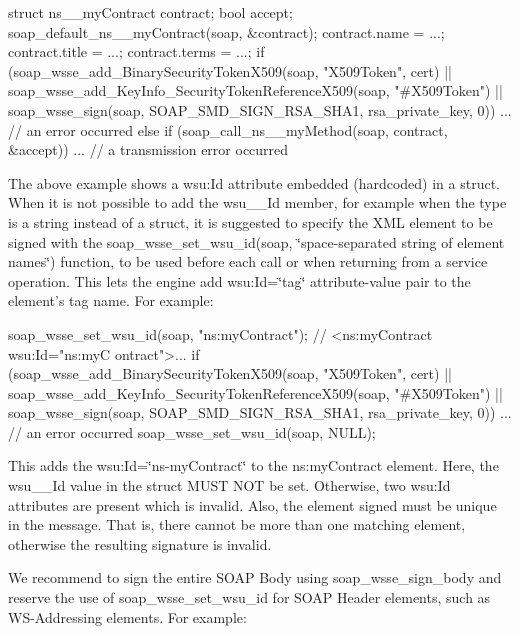 \begin{DoxyCode}
    struct ns__myContract contract;
    bool accept;
    soap_default_ns__myContract(soap, &contract);
    contract.name = ...;
    contract.title = ...;
    contract.terms = ...;
    if (soap_wsse_add_BinarySecurityTokenX509(soap, "X509Token", cert)
     || soap_wsse_add_KeyInfo_SecurityTokenReferenceX509(soap, "#X509Token")
     || soap_wsse_sign(soap, SOAP_SMD_SIGN_RSA_SHA1, rsa_private_key, 0))
      ... // an error occurred
    else if (soap_call_ns__myMethod(soap, contract, &accept))
      ... // a transmission error occurred
\end{DoxyCode}


The above example shows a wsu:Id attribute embedded (hardcoded) in a struct. When it is not possible to add the wsu\_\-\_\-Id member, for example when the type is a string instead of a struct, it is suggested to specify the XML element to be signed with the soap\_\-wsse\_\-set\_\-wsu\_\-id(soap, \char`\"{}space-\/separated string of element
names\char`\"{}) function, to be used before each call or when returning from a service operation. This lets the engine add wsu:Id=\char`\"{}tag\char`\"{} attribute-\/value pair to the element's tag name. For example:


\begin{DoxyCode}
    soap_wsse_set_wsu_id(soap, "ns:myContract"); // <ns:myContract wsu:Id="ns:myC
      ontract">...
    if (soap_wsse_add_BinarySecurityTokenX509(soap, "X509Token", cert)
     || soap_wsse_add_KeyInfo_SecurityTokenReferenceX509(soap, "#X509Token")
     || soap_wsse_sign(soap, SOAP_SMD_SIGN_RSA_SHA1, rsa_private_key, 0))
      ... // an error occurred
    soap_wsse_set_wsu_id(soap, NULL);
\end{DoxyCode}
 This adds the wsu:Id=\char`\"{}ns-\/myContract\char`\"{} to the ns:myContract element. Here, the wsu\_\-\_\-Id value in the struct MUST NOT be set. Otherwise, two wsu:Id attributes are present which is invalid. Also, the element signed must be unique in the message. That is, there cannot be more than one matching element, otherwise the resulting signature is invalid.

We recommend to sign the entire SOAP Body using soap\_\-wsse\_\-sign\_\-body and reserve the use of soap\_\-wsse\_\-set\_\-wsu\_\-id for SOAP Header elements, such as WS-\/Addressing elements. For example:


